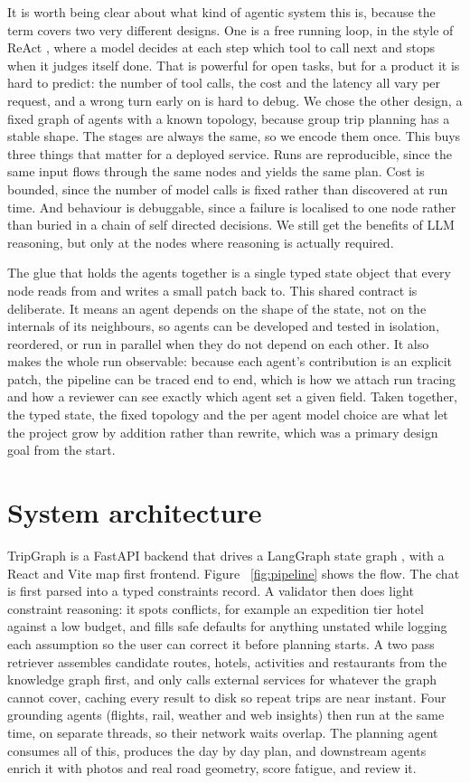 \documentclass{ecai}
\begin{document}
It is worth being clear about what kind of agentic system this is, because the
term covers two very different designs. One is a free running loop, in the
style of ReAct \citep{yao2023react}, where a model decides at each step which
tool to call next and stops when it judges itself done. That is powerful for
open tasks, but for a product it is hard to predict: the number of tool calls,
the cost and the latency all vary per request, and a wrong turn early on is
hard to debug. We chose the other design, a fixed graph of agents with a known
topology, because group trip planning has a stable shape. The stages are always
the same, so we encode them once. This buys three things that matter for a
deployed service. Runs are reproducible, since the same input flows through the
same nodes and yields the same plan. Cost is bounded, since the number of model
calls is fixed rather than discovered at run time. And behaviour is debuggable,
since a failure is localised to one node rather than buried in a chain of
self directed decisions. We still get the benefits of LLM reasoning, but only
at the nodes where reasoning is actually required.

The glue that holds the agents together is a single typed state object that
every node reads from and writes a small patch back to. This shared contract is
deliberate. It means an agent depends on the shape of the state, not on the
internals of its neighbours, so agents can be developed and tested in
isolation, reordered, or run in parallel when they do not depend on each other.
It also makes the whole run observable: because each agent's contribution is an
explicit patch, the pipeline can be traced end to end, which is how we attach
run tracing and how a reviewer can see exactly which agent set a given field.
Taken together, the typed state, the fixed topology and the per agent model
choice are what let the project grow by addition rather than rewrite, which was
a primary design goal from the start.

\section{System architecture}
\label{sec:arch}

TripGraph is a FastAPI backend that drives a LangGraph state graph
\citep{langgraph2024}, with a React and Vite map first frontend. Figure~%
\ref{fig:pipeline} shows the flow. The chat is first parsed into a typed
constraints record. A validator then does light constraint reasoning: it spots
conflicts, for example an expedition tier hotel against a low budget, and fills
safe defaults for anything unstated while logging each assumption so the user
can correct it before planning starts. A two pass retriever assembles
candidate routes, hotels, activities and restaurants from the knowledge graph
first, and only calls external services for whatever the graph cannot cover,
caching every result to disk so repeat trips are near instant. Four grounding
agents (flights, rail, weather and web insights) then run at the same time, on
separate threads, so their network waits overlap. The planning agent consumes
all of this, produces the day by day plan, and downstream agents enrich it with
photos and real road geometry, score fatigue, and review it.
\end{document}

